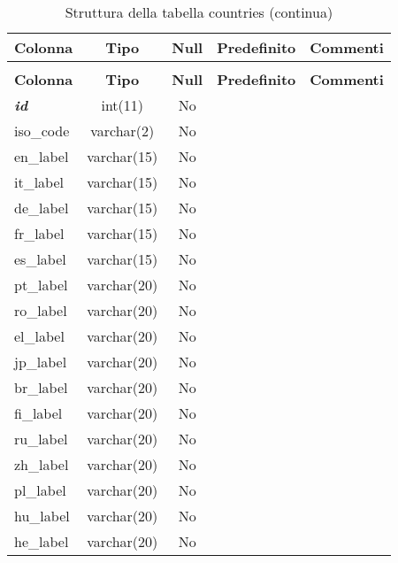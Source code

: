 %
%
 \begin{longtable}{|l|c|c|c|l|} 
 \caption{Struttura della tabella countries} \label{tab:countries-structure} \\
 \hline \multicolumn{1}{|c|}{\textbf{Colonna}} & \multicolumn{1}{|c|}{\textbf{Tipo}} & \multicolumn{1}{|c|}{\textbf{Null}} & \multicolumn{1}{|c|}{\textbf{Predefinito}} & \multicolumn{1}{|c|}{\textbf{Commenti}} \\ \hline \hline
\endfirsthead
 \caption{Struttura della tabella countries (continua)} \\ 
 \hline \multicolumn{1}{|c|}{\textbf{Colonna}} & \multicolumn{1}{|c|}{\textbf{Tipo}} & \multicolumn{1}{|c|}{\textbf{Null}} & \multicolumn{1}{|c|}{\textbf{Predefinito}} & \multicolumn{1}{|c|}{\textbf{Commenti}} \\ \hline \hline \endhead \endfoot 
\textbf{\textit{id}} & int(11) & No &  \\ \hline 
iso\_code & varchar(2) & No &  \\ \hline 
en\_label & varchar(15) & No &  \\ \hline 
it\_label & varchar(15) & No &  \\ \hline 
de\_label & varchar(15) & No &  \\ \hline 
fr\_label & varchar(15) & No &  \\ \hline 
es\_label & varchar(15) & No &  \\ \hline 
pt\_label & varchar(20) & No &  \\ \hline 
ro\_label & varchar(20) & No &  \\ \hline 
el\_label & varchar(20) & No &  \\ \hline 
jp\_label & varchar(20) & No &  \\ \hline 
br\_label & varchar(20) & No &  \\ \hline 
fi\_label & varchar(20) & No &  \\ \hline 
ru\_label & varchar(20) & No &  \\ \hline 
zh\_label & varchar(20) & No &  \\ \hline 
pl\_label & varchar(20) & No &  \\ \hline 
hu\_label & varchar(20) & No &  \\ \hline 
he\_label & varchar(20) & No &  \\ \hline 
 \end{longtable}

